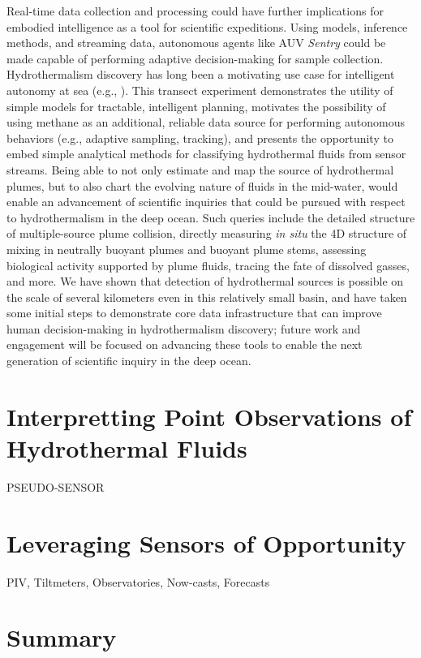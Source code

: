 Real-time data collection and processing could have further implications for embodied intelligence as a tool for scientific expeditions. Using models, inference methods, and streaming data, autonomous agents like AUV \emph{Sentry} could be made capable of performing adaptive decision-making for sample collection. Hydrothermalism discovery has long been a motivating use case for intelligent autonomy at sea (e.g., \cite{yoerger2007autonomous, jakuba2007stochastic, branch2020demonstration, wang20203}). This transect experiment demonstrates the utility of simple models for tractable, intelligent planning, motivates the possibility of using methane as an additional, reliable data source for performing autonomous behaviors (e.g., adaptive sampling, tracking), and presents the opportunity to embed simple analytical methods for classifying hydrothermal fluids from sensor streams. Being able to not only estimate and map the source of hydrothermal plumes, but to also chart the evolving nature of fluids in the mid-water, would enable an advancement of scientific inquiries that could be pursued with respect to hydrothermalism in the deep ocean. Such queries include the detailed structure of multiple-source plume collision, directly measuring \emph{in situ} the 4D structure of mixing in neutrally buoyant plumes and buoyant plume stems, assessing biological activity supported by plume fluids, tracing the fate of dissolved gasses, and more. We have shown that detection of hydrothermal sources is possible on the scale of several kilometers even in this relatively small basin, and have taken some initial steps to demonstrate core data infrastructure that can improve human decision-making in hydrothermalism discovery; future work and engagement will be focused on advancing these tools to enable the next generation of scientific inquiry in the deep ocean.


\section{Interpretting Point Observations of Hydrothermal Fluids}
PSEUDO-SENSOR

\section{Leveraging Sensors of Opportunity}
PIV, Tiltmeters, Observatories, Now-casts, Forecasts

\section{Summary}